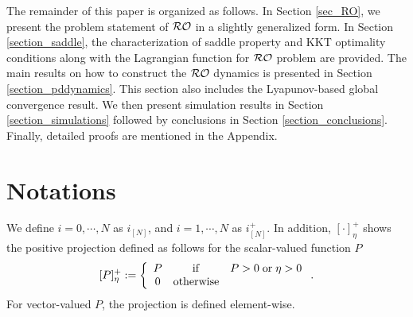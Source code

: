 \documentclass[journal,twoside,web]{ieeecolor}
\begin{document}
The remainder of this paper is organized as follows. In Section \ref{sec_RO}, we present the problem statement of ${\cal RO}$ in a slightly generalized form. In Section \ref{section_saddle}, the characterization of saddle property and KKT optimality conditions along with the Lagrangian function for ${\cal RO}$ problem are provided. The main results on how to construct the ${\cal RO}$ dynamics is presented in Section \ref{section_pddynamics}. This section also includes the Lyapunov-based global convergence result. We then present simulation results in Section \ref{section_simulations} followed by conclusions in Section \ref{section_conclusions}.
Finally, detailed proofs are mentioned in the Appendix.

\section{Notations}\label{notations}

We define $i=0,\cdots,N$ as $i_{[N]}$, and $i=1,\cdots,N$ as $i^+_{[N]}$. In addition, $\left[\cdot\right]_\eta^+$ shows the positive projection defined as follows for the scalar-valued function $P$
\begin{align} \label{proj}
[P]_\eta^+:=\left\{\begin{array}{ccl}P&{\rm if}& P>0 \;{\rm or} \;\eta>0\\
0&{\rm otherwise}
\end{array}\right..
\end{align}
For vector-valued $P$, the projection is defined element-wise.
\end{document}
